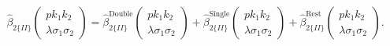 \begin{equation}
\hat{\beta}_{2\{II\}}\left(\begin{array}{c}
pk_1k_2\\\lambda\sigma_1\sigma_2
\end{array}
\right)=\hat{\beta}_{2\{II\}}^\text{Double}\left(\begin{array}{c}
pk_1k_2\\\lambda\sigma_1\sigma_2
\end{array}
\right)+\hat{\beta}_{2\{II\}}^\text{Single}\left(\begin{array}{c}
pk_1k_2\\\lambda\sigma_1\sigma_2
\end{array}
\right)+\hat{\beta}_{2\{II\}}^\text{Rest}\left(\begin{array}{c}
pk_1k_2\\\lambda\sigma_1\sigma_2
\end{array}
\right).
\end{equation}

